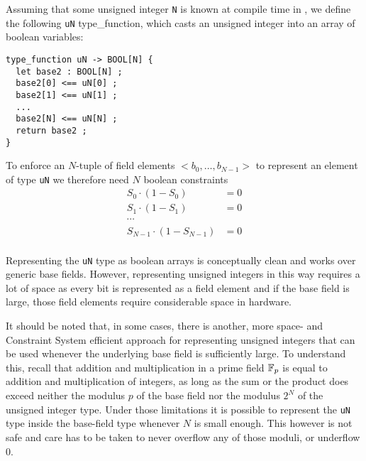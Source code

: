 Assuming that some unsigned integer \texttt{N} is known at compile time in , we define the following \texttt{uN} type\_function, which casts an unsigned integer into an array of boolean variables:
\begin{lstlisting}
type_function uN -> BOOL[N] { 
  let base2 : BOOL[N] ;
  base2[0] <== uN[0] ;
  base2[1] <== uN[1] ;
  ...
  base2[N] <== uN[N] ; 
  return base2 ;
}
\end{lstlisting}
To enforce an $N$-tuple of field elements $<b_0,\ldots,b_{N-1}>$ to represent an element of type \texttt{uN} we therefore need $N$ boolean constraints 
\begin{align*}
S_0 \cdot (1-S_0) & = 0\\
S_1 \cdot (1-S_1) & = 0\\
\cdots &\\
S_{N-1} \cdot (1-S_{N-1}) & = 0\\
\end{align*}
\begin{remark} Representing the \texttt{uN} type as boolean arrays is conceptually clean and works over generic base fields. However, representing unsigned integers in this way requires a lot of space as every bit is represented as a field element and if the base field is large, those field elements require considerable space in hardware.

It should be noted that, in some cases, there is another, more space- and Constraint System efficient approach for representing unsigned integers that can be used whenever the underlying base field is sufficiently large. To understand this, recall that addition and multiplication in a prime field $\mathbb{F}_p$ is equal to addition and multiplication of integers, as long as the sum or the product does exceed neither the modulus $p$ of the base field nor the modulus $2^N$ of the unsigned integer type. Under those limitations it is possible to represent the \texttt{uN} type inside the base-field type whenever $N$ is small enough. This however is not safe and care has to be taken to never overflow any of those moduli, or underflow $0$.
\end{remark}
